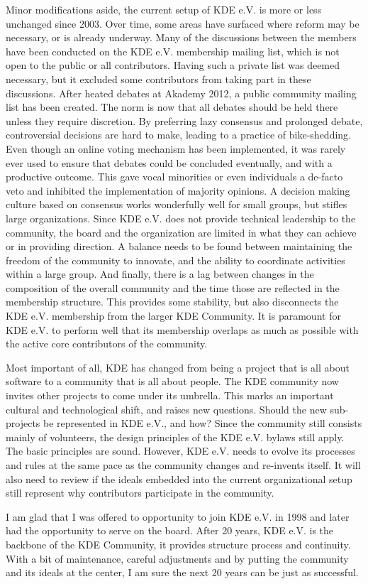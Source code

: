 Minor modifications aside, the current setup of KDE e.V. is more or
less unchanged since 2003. Over time, some areas have surfaced where
reform may be necessary, or is already underway. Many of the
discussions between the members 
have been conducted on the KDE e.V. membership mailing list, which is
not open to the public or all contributors. Having such a private list
was deemed necessary, but it excluded some contributors from taking
part in these discussions. After heated debates at Akademy 2012, a
public community mailing list has been created. The norm is now that all
debates should be held there unless they require discretion. By
preferring lazy consensus and prolonged debate, controversial decisions
are hard to make, leading to a practice of bike-shedding.
Even though an online voting mechanism has been implemented, it was
rarely ever used to ensure that debates could be concluded eventually,
and with a productive outcome. This gave vocal minorities or even
individuals a de-facto veto and inhibited the implementation of
majority opinions. A decision making culture based on consensus works
wonderfully well for small groups, but stifles large organizations.
Since KDE e.V. does not provide technical leadership to
the community, the board and the organization are limited in what they
can achieve or in providing direction. A balance needs to be found
between maintaining the freedom of the community to innovate, and the
ability to coordinate activities within a large group. And finally,
there is a lag between changes in the composition of the overall
community and the time those are reflected in the membership
structure. This provides some stability, but also disconnects the KDE
e.V. membership from the larger KDE Community. It is paramount
for KDE e.V. to perform well that its membership overlaps as much as
possible with the active core contributors of the community.

Most important of all, KDE has changed from being a project that is
all about software to a community that is all about people. The KDE
community now invites other projects to come under its umbrella. This
marks an important cultural and technological shift, and raises new
questions. Should the new sub-projects be represented in KDE e.V., and
how? Since the community still consists mainly of volunteers, the
design principles of the KDE e.V. bylaws still apply. The basic
principles are sound. However, KDE e.V. needs to evolve its processes
and rules at the same pace as the community changes and re-invents
itself. It will also need to review if the ideals embedded into the
current organizational setup still represent why contributors
participate in the community. 

I am glad that I was offered to opportunity to join KDE e.V. in 1998
and later had the opportunity to serve on the board. After 20 years,
KDE e.V. is the backbone of the KDE Community, it provides structure
process and continuity. With a bit of maintenance, careful adjustments
and by putting the community and its ideals at the center, I am sure
the next 20 years can be just as successful. 


